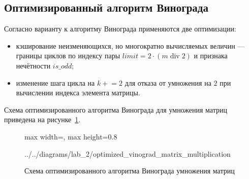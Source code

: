 \documentclass{bmstu}
\begin{document}
\subsection{Оптимизированный алгоритм Винограда}
Согласно варианту к алгоритму Винограда применяются две оптимизации:
\begin{itemize}
	\item кэширование неизменяющихся, но многократно вычисляемых величин ---
	      границы циклов по индексу пары
	      $\mathit{limit} = 2 \cdot (m \;\mathrm{div}\; 2)$ и признака
	      нечётности $\mathit{is\_odd}$;
	\item изменение шага цикла на $k \mathrel{+}= 2$ для отказа от умножения
	      на $2$ при вычислении индекса элемента матрицы.
\end{itemize}

Схема оптимизированного алгоритма Винограда для умножения матриц приведена на рисунке~\ref{fig:optimized_vinograd_matrix_multiplication}.
\begin{figure}[H]
	\centering
	\begin{adjustbox}{max width=\textwidth, max height=0.8\textheight}
		
		{../../diagrams/lab_2/optimized_vinograd_matrix_multiplication}
	\end{adjustbox}
	\caption{Схема оптимизированного алгоритма Винограда умножения матриц}
	\label{fig:optimized_vinograd_matrix_multiplication}
\end{figure}
\end{document}
